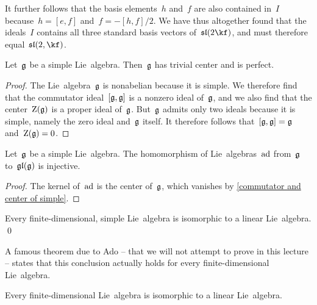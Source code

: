 \begin{examples}
\begin{enumerate}
			It further follows that the basis elements~$h$ and~$f$ are also contained in~$I$ because~$h = [e,f]$ and~$f = -[h,f]/2$.
			We have thus altogether found that the ideals~$I$ contains all three standard basis vectors of~$\sllie(2 \kf)$, and must therefore equal~$\sllie(2, \kf)$.
	\end{enumerate}
\end{examples}


\begin{proposition}
	\label{commutator and center of simple}
	Let~$\mathfrak{g}$ be a simple Lie~algebra.
	Then~$\mathfrak{g}$ has trivial center and is perfect.
\end{proposition}


\begin{proof}
	The Lie~algebra~$\mathfrak{g}$ is nonabelian because it is simple.
	We therefore find that the commutator ideal~$[\mathfrak{g}, \mathfrak{g}]$ is a nonzero ideal of~$\mathfrak{g}$, and we also find that the center~$\operatorname{Z}(\mathfrak{g})$ is a proper ideal of~$\mathfrak{g}$.
	But~$\mathfrak{g}$ admits only two ideals because it is simple, namely the zero ideal and~$\mathfrak{g}$ itself.
	It therefore follows that~$[\mathfrak{g}, \mathfrak{g}] = \mathfrak{g}$ and~$\operatorname{Z}(\mathfrak{g}) = 0$.
\end{proof}


\begin{corollary}
	\label{ad is injective for simple}
	Let~$\mathfrak{g}$ be a simple Lie~algebra.
	The homomorphism of Lie~algebras~$\operatorname{ad}$ from~$\mathfrak{g}$ to~$\mathfrak{gl}(\mathfrak{g})$ is injective.
\end{corollary}


\begin{proof}
	The kernel of~$\operatorname{ad}$ is the center of~$\mathfrak{g}$, which vanishes by \cref{commutator and center of simple}.
\end{proof}


\begin{corollary}
	Every finite-dimensional, simple Lie~algebra is isomorphic to a linear Lie~algebra.
	\qed
\end{corollary}


\begin{fluff}
	A famous theorem due to Ado -- that we will not attempt to prove in this lecture -- states that this conclusion actually holds for every finite-dimensional Lie~algebra.
\end{fluff}


\begin{theorem}
	\label{Ado’s theorem}
	Every finite-dimensional Lie~algebra is isomorphic to a linear Lie~algebra.
\end{theorem}


